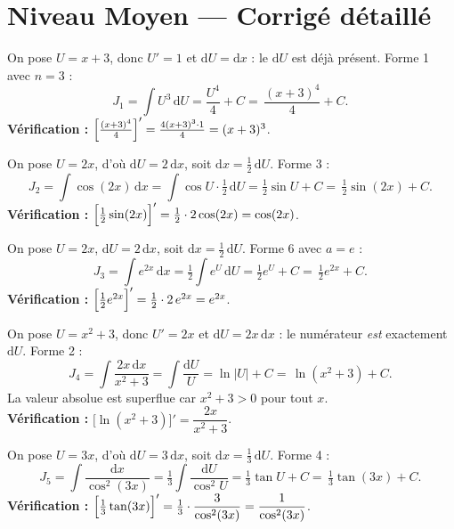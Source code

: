 \documentclass[11pt,a4paper]{article}
\newcommand{\dd}{\mathrm{d}}
\newcommand{\tg}{\tan}\newcommand{\cotg}{\cot}
\begin{document}
\section*{Niveau Moyen — Corrigé détaillé}

\begin{corr}
On pose $U=x+3$, donc $U'=1$ et $\dd U=\dd x$ : le $\dd U$ est déjà présent. Forme 1 avec $n=3$ :
\[
J_1=\int U^3\,\dd U=\frac{U^4}{4}+C=\boxed{\,\frac{(x+3)^4}{4}+C.\,}
\]
\textbf{Vérification :} $\Bigl[\tfrac{(x+3)^4}{4}\Bigr]'=\tfrac{4(x+3)^3\cdot 1}{4}=(x+3)^3$. \checkmark
\end{corr}

\begin{corr}
On pose $U=2x$, d'où $\dd U=2\,\dd x$, soit $\dd x=\tfrac12\,\dd U$. Forme 3 :
\[
J_2=\int \cos(2x)\,\dd x=\int \cos U\cdot\tfrac12\,\dd U=\tfrac12\sin U+C
=\boxed{\,\tfrac12\sin(2x)+C.\,}
\]
\textbf{Vérification :} $\Bigl[\tfrac12\sin(2x)\Bigr]'=\tfrac12\cdot 2\cos(2x)=\cos(2x)$. \checkmark
\end{corr}

\begin{corr}
On pose $U=2x$, $\dd U=2\,\dd x$, soit $\dd x=\tfrac12\,\dd U$. Forme 6 avec $a=e$ :
\[
J_3=\int e^{2x}\,\dd x=\tfrac12\int e^{U}\,\dd U=\tfrac12 e^{U}+C
=\boxed{\,\tfrac12 e^{2x}+C.\,}
\]
\textbf{Vérification :} $\Bigl[\tfrac12 e^{2x}\Bigr]'=\tfrac12\cdot 2\,e^{2x}=e^{2x}$. \checkmark
\end{corr}

\begin{corr}[4 — le $\dd U$ presque prêt]
On pose $U=x^2+3$, donc $U'=2x$ et $\dd U=2x\,\dd x$ : le numérateur \emph{est} exactement $\dd U$.
Forme 2 :
\[
J_4=\int \frac{2x\,\dd x}{x^2+3}=\int\frac{\dd U}{U}=\ln|U|+C=\boxed{\,\ln(x^2+3)+C.\,}
\]
La valeur absolue est superflue car $x^2+3>0$ pour tout $x$.\\
\textbf{Vérification :} $\bigl[\ln(x^2+3)\bigr]'=\dfrac{2x}{x^2+3}$. \checkmark
\end{corr}

\begin{corr}
On pose $U=3x$, d'où $\dd U=3\,\dd x$, soit $\dd x=\tfrac13\,\dd U$. Forme 4 :
\[
J_5=\int \frac{\dd x}{\cos^2(3x)}=\tfrac13\int\frac{\dd U}{\cos^2 U}=\tfrac13\tg U+C
=\boxed{\,\tfrac13\tan(3x)+C.\,}
\]
\textbf{Vérification :} $\Bigl[\tfrac13\tan(3x)\Bigr]'=\tfrac13\cdot\dfrac{3}{\cos^2(3x)}=\dfrac{1}{\cos^2(3x)}$. \checkmark
\end{corr}
\end{document}
